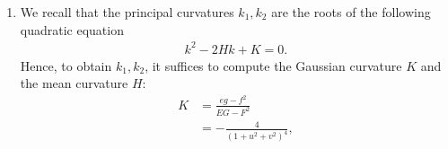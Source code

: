 \documentclass[a4paper]{article}
\numberwithin{equation}{section}
\begin{document}
\begin{enumerate}
\begin{align}
{{{\begin{array}{*{20}{c}}
{1 - {u^2} + {v^2}}&{2uv}&{ - 2u}\\
{2uv}&{1 - {v^2} + {u^2}}&{2v}\\
{2u}&{ - 2v}&2
\end{array}} \right|}}{{{{\left( {1 + {u^2} + {v^2}} \right)}^2}}}\\
& = \frac{{2{{\left( {1 + {u^2} + {v^2}} \right)}^2}}}{{{{\left( {1 + {u^2} + {v^2}} \right)}^2}}}\\
& = 2,\\
f &= \left\langle {N,{\mathbf{x}_{uv}}} \right\rangle \\
& = \frac{{\left( {{\mathbf{x}_u},{\mathbf{x}_v},{\mathbf{x}_{uv}}} \right)}}{{\sqrt {EG - {F^2}} }}\\
& = \frac{{\left| {\begin{array}{*{20}{c}}
{1 - {u^2} + {v^2}}&{2uv}&{2v}\\
{2uv}&{1 - {v^2} + {u^2}}&{2u}\\
{2u}&{ - 2v}&0
\end{array}} \right|}}{{{{\left( {1 + {u^2} + {v^2}} \right)}^2}}}\\
 &= 0,\\
g &= \left\langle {N,{\mathbf{x}_{vv}}} \right\rangle \\
& = \frac{{\left( {{\mathbf{x}_u},{\mathbf{x}_v},{\mathbf{x}_{vv}}} \right)}}{{\sqrt {EG - {F^2}} }}\\
& = \frac{{\left| {\begin{array}{*{20}{c}}
{1 - {u^2} + {v^2}}&{2uv}&{2u}\\
{2uv}&{1 - {v^2} + {u^2}}&{ - 2v}\\
{2u}&{ - 2v}&{ - 2}
\end{array}} \right|}}{{{{\left( {1 + {u^2} + {v^2}} \right)}^2}}}\\
& =  - \frac{{2{{\left( {1 + {u^2} + {v^2}} \right)}^2}}}{{{{\left( {1 + {u^2} + {v^2}} \right)}^2}}}\\
& =  - 2,
\end{align}
i.e., \eqref{1.3} holds. 
\item We recall that the principal curvatures $k_1,k_2$ are the roots of the following quadratic equation 
\begin{align}
\label{1.34}
{k^2} - 2Hk + K = 0.
\end{align}
Hence, to obtain $k_1,k_2$, it suffices to compute the Gaussian curvature $K$ and the mean curvature $H$:
\begin{align}
K &= \frac{{eg - {f^2}}}{{EG - {F^2}}}\\
 &=  - \frac{4}{{{{\left( {1 + {u^2} + {v^2}} \right)}^4}}},\\

\end{align}
\end{enumerate}
\end{document}

